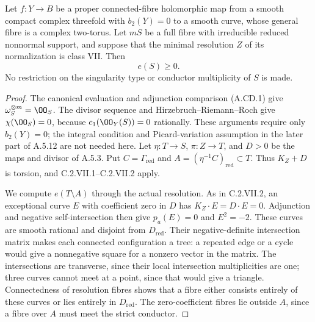 \begin{theorem}
\label{st:C.2.VII.3}
Let $f:Y\to B$ be a proper connected-fibre holomorphic
map from a smooth compact complex threefold with
$b_2(Y)=0$ to a smooth curve, whose general fibre is a
complex two-torus. Let $mS$ be a full fibre with
irreducible reduced nonnormal support, and suppose
that the minimal resolution $Z$ of its normalization
is class VII. Then
\[
 e(S)\ge0.
\tag{C.VII.7}
\]
No restriction on the singularity type or conductor
multiplicity of $S$ is made.
\end{theorem}
\begin{proof}
The canonical evaluation and adjunction comparison
(A.CD.1) give $\omega_S^{\otimes m}=\OO_S$.
The divisor sequence and Hirzebruch--Riemann--Roch
give $\chi(\OO_S)=0$, because $c_1(\OO_Y(S))=0$
rationally. These arguments require only $b_2(Y)=0$;
the integral condition and Picard-variation assumption
in the later part of A.5.12 are not needed here.
Let $\eta:T\to S$, $\pi:Z\to T$, and
$D>0$ be the maps and divisor of A.5.3. Put
$C=\Gamma_{\mathrm{red}}$ and
$A=(\eta^{-1}C)_{\mathrm{red}}\subset T$.
Thus $K_Z+D$ is torsion, and C.2.VII.1--C.2.VII.2
apply.

We compute $e(T\setminus A)$ through the actual
resolution. As in C.2.VII.2, an exceptional curve
$E$ with coefficient zero in $D$ has
$K_Z\cdot E=D\cdot E=0$.
Adjunction and negative self-intersection then give
$p_a(E)=0$ and $E^2=-2$.
These curves are smooth rational and disjoint
from $D_{\mathrm{red}}$.
Their negative-definite intersection matrix makes
each connected configuration a tree: a repeated
edge or a cycle would give a nonnegative square
for a nonzero vector in the matrix. The intersections
are transverse, since their local intersection
multiplicities are one; three curves cannot meet
at a point, since that would give a triangle.
Connectedness of resolution fibres shows that a
fibre either consists entirely of these curves or
lies entirely in $D_{\mathrm{red}}$.
The zero-coefficient fibres lie outside $A$, since
a fibre over $A$ must meet the strict conductor.


\end{proof}

